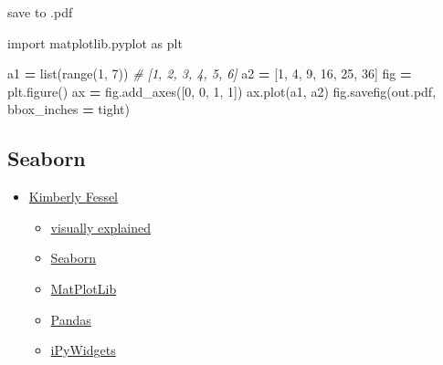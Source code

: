 \documentclass[
]{book}
\newenvironment{Shaded}{\begin{snugshade}}{\end{snugshade}}
\newcommand{\BuiltInTok}[1]{#1}
\newcommand{\CommentTok}[1]{\textcolor[rgb]{0.56,0.35,0.01}{\textit{#1}}}
\newcommand{\DecValTok}[1]{\textcolor[rgb]{0.00,0.00,0.81}{#1}}
\newcommand{\ImportTok}[1]{#1}
\newcommand{\NormalTok}[1]{#1}
\newcommand{\OperatorTok}[1]{\textcolor[rgb]{0.81,0.36,0.00}{\textbf{#1}}}
\newcommand{\StringTok}[1]{\textcolor[rgb]{0.31,0.60,0.02}{#1}}
\providecommand{\tightlist}{%
  \setlength{\itemsep}{0pt}\setlength{\parskip}{0pt}}
\theoremstyle{definition}
\theoremstyle{definition}
\theoremstyle{definition}
\theoremstyle{definition}
\theoremstyle{remark}
\begin{document}
save to .pdf

\begin{Shaded}
\begin{Highlighting}[]
\ImportTok{import}\NormalTok{ matplotlib.pyplot }\ImportTok{as}\NormalTok{ plt}

\NormalTok{a1 }\OperatorTok{=} \BuiltInTok{list}\NormalTok{(}\BuiltInTok{range}\NormalTok{(}\DecValTok{1}\NormalTok{, }\DecValTok{7}\NormalTok{)) }\CommentTok{\# [1, 2, 3, 4, 5, 6]}
\NormalTok{a2 }\OperatorTok{=}\NormalTok{ [}\DecValTok{1}\NormalTok{, }\DecValTok{4}\NormalTok{, }\DecValTok{9}\NormalTok{, }\DecValTok{16}\NormalTok{, }\DecValTok{25}\NormalTok{, }\DecValTok{36}\NormalTok{]}
\NormalTok{fig }\OperatorTok{=}\NormalTok{ plt.figure()}
\NormalTok{ax }\OperatorTok{=}\NormalTok{ fig.add\_axes([}\DecValTok{0}\NormalTok{, }\DecValTok{0}\NormalTok{, }\DecValTok{1}\NormalTok{, }\DecValTok{1}\NormalTok{])}
\NormalTok{ax.plot(a1, a2)}
\NormalTok{fig.savefig(}\StringTok{\textquotesingle{}out.pdf\textquotesingle{}}\NormalTok{, bbox\_inches }\OperatorTok{=} \StringTok{\textquotesingle{}tight\textquotesingle{}}\NormalTok{)}
\end{Highlighting}
\end{Shaded}

\subsection{Seaborn}\label{seaborn}

\begin{itemize}
\tightlist
\item
  \href{https://www.youtube.com/@KimberlyFessel/playlists}{Kimberly Fessel}

  \begin{itemize}
  \tightlist
  \item
    \href{https://www.youtube.com/playlist?list=PLtPIclEQf-3cYc7tP_mxrvNtp82NWVf8p}{visually explained}
  \item
    \href{https://www.youtube.com/playlist?list=PLtPIclEQf-3cG31dxSMZ8KTcDG7zYng1j}{Seaborn}
  \item
    \href{https://www.youtube.com/playlist?list=PLtPIclEQf-3dJmAj3IsSRwRoLbX-n3J81}{MatPlotLib}
  \item
    \href{https://www.youtube.com/playlist?list=PLtPIclEQf-3c-pUgSttUGV-3Y2D9g_0sW}{Pandas}
  \item
    \href{https://www.youtube.com/playlist?list=PLtPIclEQf-3fhfoFQU2MJYnQ6CyjQLQEa}{iPyWidgets}
  \end{itemize}
\end{itemize}
\end{document}
